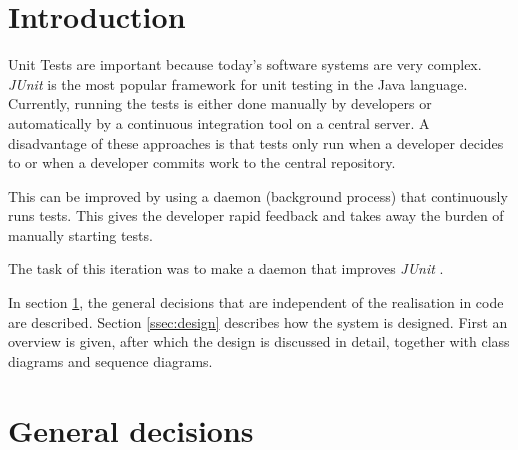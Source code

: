 \documentclass[i2]{oss}
\newcommand{\junit}{\emph{JUnit }}
\begin{document}

\maketitlepage
\newpage
\tableofcontents
\pagebreak




\section*{Introduction}
\label{ssec:introduction}

Unit Tests are important because today's software systems are very 
complex.
\junit is the most popular framework for unit testing in the Java 
language.
Currently, running the tests is either done manually by developers or
automatically by a continuous integration tool on a central server.
A disadvantage of these approaches is that tests only run when a 
developer decides to or when a developer commits work to the central 
repository.

This can be improved by using a daemon (background process) that continuously runs tests.
This gives the developer rapid feedback and takes away the burden of manually starting tests.

The task of this iteration was to make a daemon that improves \junit.

In section \ref{ssec:general-decisions}, the general decisions that are independent of the realisation in code are described. Section \ref{ssec:design} describes how the system is designed. First an overview is given, after which the design is discussed in detail, together with class diagrams and sequence diagrams.

\section{General decisions}
\label{ssec:general-decisions}
\end{document}
